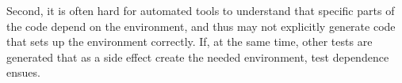 

Second, it is often hard for automated tools to understand that
specific parts of the code depend on the environment, and thus may not
explicitly generate code that sets up the environment correctly. If,
at the same time, other tests are generated that as a side effect
create the needed environment, test dependence ensues.



